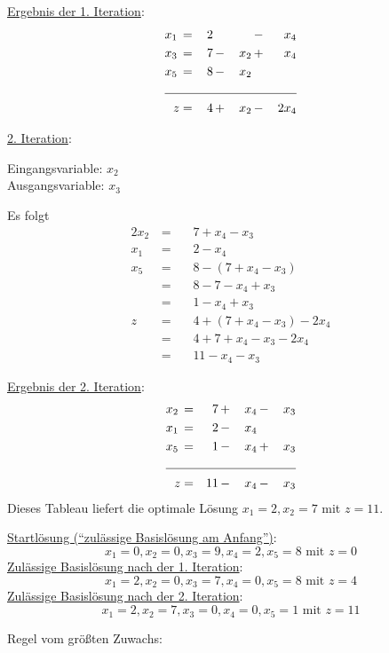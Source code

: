 \documentclass[10pt,a4paper,oneside,ngerman,numbers=noenddot]{scrartcl}
\begin{document}
		\underline{Ergebnis der 1. Iteration}:
		\begin{alignat*}{4}
			x_{1} \,&=&\, 2 \,&& &-&\, x_{4} \\
			x_{3} \,&=&\, 7 \,&-&\, x_{2} \,&+&\, x_{4} \\
			x_{5} \,&=&\, 8 \,&-&\, x_{2} \,&& \\ \cline{1 - 7}
			z &=& 4 \,&+&\, x_{2} \,&-&\, 2x_{4}
		\end{alignat*}
		
		\underline{2. Iteration}:
		
		Eingangsvariable: $x_{2}$ \\
		Ausgangsvariable: $x_{3}$
		
		Es folgt
		\begin{alignat*}{2}
			x_{2} \,&=&&\, 7 + x_{4} - x_{3} \\
			x_{1} \,&=&&\, 2 - x_{4}\\
			x_{5} \,&=&&\, 8 - \left(7 + x_{4} - x_{3}\right) \\
			&=&&\, 8 - 7 - x_{4} + x_{3} \\
			&=&&\, 1 - x_{4} + x_{3} \\
			z \,&=&&\, 4 + \left(7 + x_{4} - x_{3}\right) - 2x_{4} \\
			&=&&\, 4 + 7 + x_{4} - x_{3} - 2x_{4} \\
			&=&&\, 11 - x_{4} - x_{3} 
		\end{alignat*}
		
		\underline{Ergebnis der 2. Iteration}:
		\begin{alignat*}{4}
			x_{2} \,&=&\, 7 \,&+&\, x_{4} \,&-&\, x_{3} \\
			x_{1} \,&=&\, 2 \,&-&\, x_{4} \,&& \\
			x_{5} \,&=&\, 1 \,&-&\, x_{4} \,&+&\, x_{3} \\ \cline{1 - 7}
			z &=& 11 \,&-&\, x_{4} \,&-&\, x_{3}
		\end{alignat*}
		Dieses Tableau liefert die optimale Lösung $x_{1} = 2, x_{2} = 7$ mit $z = 11$.
		
		\underline{Startlösung ("`zulässige Basislösung am Anfang"')}:
		\[
			x_{1} = 0, x_{2} = 0, x_{3} = 9, x_{4} = 2, x_{5} = 8 \text{ mit } z = 0
		\]
		\underline{Zulässige Basislösung nach der 1. Iteration}:
		\[
			x_{1} = 2, x_{2} = 0, x_{3} = 7, x_{4} = 0, x_{5} = 8 \text{ mit } z = 4
		\]
		\underline{Zulässige Basislösung nach der 2. Iteration}:
		\[
			x_{1} = 2, x_{2} = 7, x_{3} = 0, x_{4} = 0, x_{5} = 1 \text{ mit } z = 11
		\]				
				
			Regel vom größten Zuwachs:
			
\end{document}
